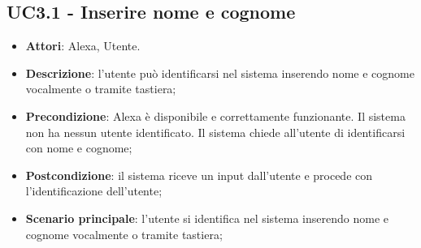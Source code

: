 \documentclass[../AnalisiDeiRequisiti_v3.0.0.tex]{subfiles}
\begin{document}
\subsection{UC3.1 - Inserire nome e cognome} 
\label{sssec:UC3.1} 
\begin{itemize} 
\item \textbf{Attori}: Alexa, Utente.
\item \textbf{Descrizione}: l'utente può identificarsi nel sistema inserendo nome e cognome vocalmente o tramite tastiera;
\item \textbf{Precondizione}: Alexa è disponibile e correttamente funzionante. Il sistema non ha nessun utente identificato. Il sistema chiede all'utente di identificarsi con nome e cognome;
\item \textbf{Postcondizione}: il sistema riceve un input dall'utente e procede con l'identificazione dell'utente;
\item \textbf{Scenario principale}: l'utente si identifica nel sistema inserendo nome e cognome vocalmente o tramite tastiera;
\end{itemize} 
\end{document}
